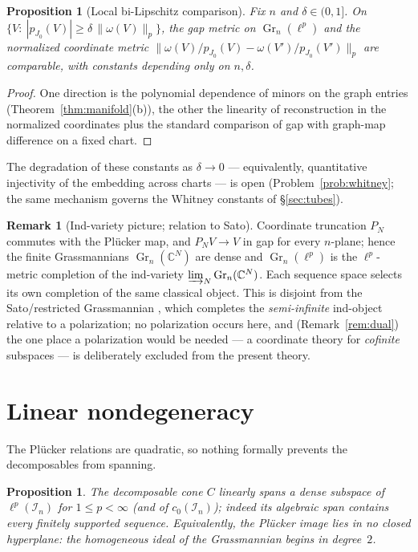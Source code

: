 \documentclass[11pt]{amsart}
\newtheorem{proposition}[theorem]{Proposition}
\theoremstyle{definition}
\newtheorem{remark}[theorem]{Remark}
\newcommand{\C}{\mathbb{C}}
\newcommand{\Gr}{\operatorname{Gr}}
\begin{document}
\begin{proposition}[Local bi-Lipschitz comparison]\label{prop:bilip}
Fix $n$ and $\delta\in(0,1]$. On $\{V:\ |p_{J_0}(V)|\ge\delta\,\|\omega(V)\|_p\}$, the gap metric \cite[IV.\S2]{Kato} on $\Gr_n(\ell^p)$ and the normalized coordinate metric $\big\|\omega(V)/p_{J_0}(V)-\omega(V')/p_{J_0}(V')\big\|_p$ are comparable, with constants depending only on $n,\delta$.
\end{proposition}

\begin{proof}
One direction is the polynomial dependence of minors on the graph entries (Theorem~\ref{thm:manifold}(b)), the other the linearity of reconstruction in the normalized coordinates plus the standard comparison of gap with graph-map difference on a fixed chart.
\end{proof}

The degradation of these constants as $\delta\to0$ --- equivalently, quantitative injectivity of the embedding across charts --- is open (Problem~\ref{prob:whitney}; the same mechanism governs the Whitney constants of \S\ref{sec:tubes}).

\begin{remark}[Ind-variety picture; relation to Sato]\label{rem:ind}
Coordinate truncation $P_N$ commutes with the Pl\"ucker map, and $P_NV\to V$ in gap for every $n$-plane; hence the finite Grassmannians $\Gr_n(\C^N)$ are dense and $\Gr_n(\ell^p)$ is the $\ell^p$-metric completion of the ind-variety $\varinjlim_N\Gr_n(\C^N)$. Each sequence space selects its own completion of the same classical object. This is disjoint from the Sato/restricted Grassmannian \cite{PS,SW}, which completes the \emph{semi-infinite} ind-object relative to a polarization; no polarization occurs here, and (Remark~\ref{rem:dual}) the one place a polarization would be needed --- a coordinate theory for \emph{cofinite} subspaces --- is deliberately excluded from the present theory.
\end{remark}

\section{Linear nondegeneracy}\label{sec:span}

The Pl\"ucker relations are quadratic, so nothing formally prevents the decomposables from spanning.

\begin{proposition}\label{prop:span}
The decomposable cone $C$ linearly spans a dense subspace of $\ell^p(\mathcal I_n)$ for $1\le p<\infty$ \textup{(}and of $c_0(\mathcal I_n)$\textup{)}; indeed its algebraic span contains every finitely supported sequence. Equivalently, the Pl\"ucker image lies in no closed hyperplane: the homogeneous ideal of the Grassmannian begins in degree~$2$.
\end{proposition}
\end{document}
